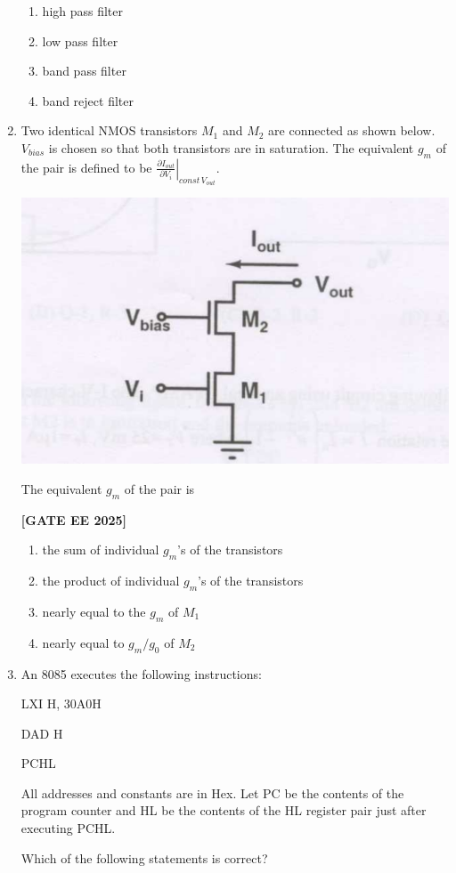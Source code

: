 \documentclass[12pt]{article}
\begin{document}
\begin{enumerate}[leftmargin=*, label=\textbf{Q.\arabic*:}]
\begin{enumerate}
  \item high pass filter
  \item low pass filter
  \item band pass filter
  \item band reject filter
\end{enumerate}

\item Two identical NMOS transistors $M_1$ and $M_2$ are connected as shown below. $V_{bias}$ is chosen so that both transistors are in saturation. The equivalent $g_m$ of the pair is defined to be $\left. \frac{\partial I_{out}}{\partial V_i} \right|_{const\, V_{out}}$.

\begin{center}
\includegraphics[width=0.5\columnwidth]{figs/q48.png}
\end{center}

The equivalent $g_m$ of the pair is
 
\noindent \textbf{[GATE EE 2025]}
\begin{enumerate}
  \item the sum of individual $g_m$'s of the transistors
  \item the product of individual $g_m$'s of the transistors
  \item nearly equal to the $g_m$ of $M_1$
  \item nearly equal to $g_m/g_{0}$ of $M_2$
\end{enumerate}

\item An 8085 executes the following instructions:

LXI H, 30A0H

DAD H

PCHL

All addresses and constants are in Hex. Let PC be the contents of the program counter and HL be the contents of the HL register pair just after executing PCHL.

Which of the following statements is correct?
 

\end{enumerate}
\end{document}
